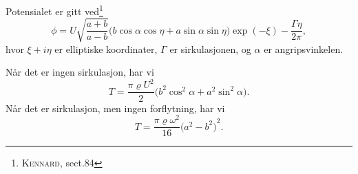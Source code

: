 Potensialet er gitt ved\footnote{\cite{kennard1967irrotational} \textsc{Kennard}, sect.84}
\[
\phi = U \sqrt{\frac{a + b}{a - b}} \big( b\cos{\alpha}\cos{\eta} + a\sin{\alpha}\sin{\eta} \big) \exp(-\xi) - \frac{\Gamma \eta}{2\pi},
\]
hvor $\xi + i\eta$ er elliptiske koordinater, $\Gamma$ er sirkulasjonen, og $\alpha$ er angripsvinkelen.

Når det er ingen sirkulasjon, har vi
\[
T = \frac{\pi\varrho U^2}{2} \big( b^2\cos^2{\alpha} + a^2\sin^2{\alpha} \big).
\]
Når det er sirkulasjon, men ingen forflytning, har vi
\[
T = \frac{\pi \varrho \omega^2}{16} {\big( a^2 - b^2 \big)}^2.
\]
